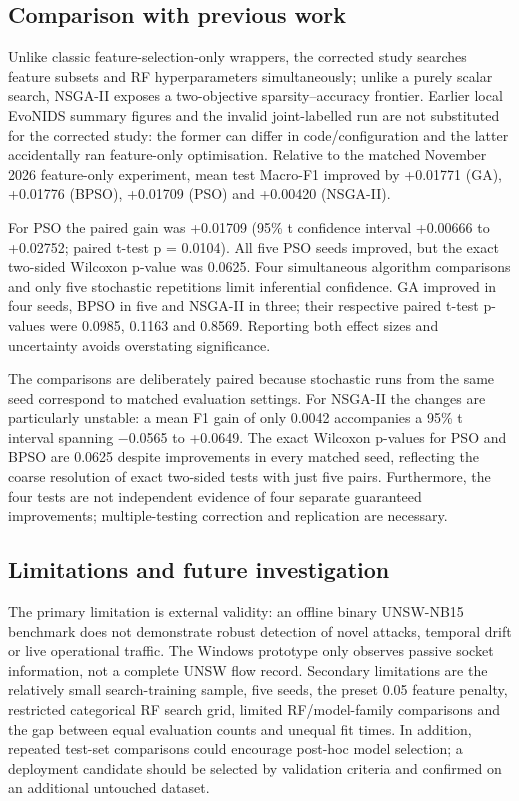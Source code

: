 \documentclass[10pt,a4paper,twocolumn]{extarticle}
\begin{document}
\subsection{Comparison with previous work}
Unlike classic feature-selection-only wrappers, the corrected study searches feature subsets and RF hyperparameters simultaneously; unlike a purely scalar search, NSGA-II exposes a two-objective sparsity--accuracy frontier. Earlier local EvoNIDS summary figures and the invalid joint-labelled run are not substituted for the corrected study: the former can differ in code/configuration and the latter accidentally ran feature-only optimisation. Relative to the matched November 2026 feature-only experiment, mean test Macro-F1 improved by +0.01771 (GA), +0.01776 (BPSO), +0.01709 (PSO) and +0.00420 (NSGA-II).

For PSO the paired gain was +0.01709 (95\% t confidence interval +0.00666 to +0.02752; paired t-test p = 0.0104). All five PSO seeds improved, but the exact two-sided Wilcoxon p-value was 0.0625. Four simultaneous algorithm comparisons and only five stochastic repetitions limit inferential confidence. GA improved in four seeds, BPSO in five and NSGA-II in three; their respective paired t-test p-values were 0.0985, 0.1163 and 0.8569. Reporting both effect sizes and uncertainty avoids overstating significance.

The comparisons are deliberately paired because stochastic runs from the same seed correspond to matched evaluation settings. For NSGA-II the changes are particularly unstable: a mean F1 gain of only 0.0042 accompanies a 95\% t interval spanning $-$0.0565 to +0.0649. The exact Wilcoxon p-values for PSO and BPSO are 0.0625 despite improvements in every matched seed, reflecting the coarse resolution of exact two-sided tests with just five pairs. Furthermore, the four tests are not independent evidence of four separate guaranteed improvements; multiple-testing correction and replication are necessary.

\subsection{Limitations and future investigation}
The primary limitation is external validity: an offline binary UNSW-NB15 benchmark does not demonstrate robust detection of novel attacks, temporal drift or live operational traffic. The Windows prototype only observes passive socket information, not a complete UNSW flow record. Secondary limitations are the relatively small search-training sample, five seeds, the preset 0.05 feature penalty, restricted categorical RF search grid, limited RF/model-family comparisons and the gap between equal evaluation counts and unequal fit times. In addition, repeated test-set comparisons could encourage post-hoc model selection; a deployment candidate should be selected by validation criteria and confirmed on an additional untouched dataset.
\end{document}
